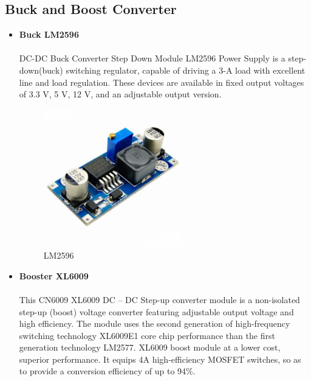 \newpage

\subsection{Buck and Boost Converter}

\begin{itemize}[wide, labelwidth=!, labelindent=0pt]
    \item \textbf{Buck LM2596}
    \vspace{-0.5cm}
    \paragraph{}DC-DC Buck Converter Step Down Module LM2596 Power Supply is a step-down(buck) switching regulator, capable of driving a 3-A load with excellent line and load regulation. These devices are available in fixed output voltages of 3.3 V, 5 V, 12 V, and an adjustable output version.
    
    \begin{figure}[H]
    \centering
    \includegraphics[width = 6cm]{project/images/lm2596.jpg}
    \caption{LM2596}
    \end{figure}
    
    
    \item \textbf{Booster XL6009}
    \vspace{-0.5cm}
    \paragraph{}This CN6009 XL6009 DC – DC Step-up converter module is a non-isolated step-up (boost) voltage converter featuring adjustable output voltage and high efficiency. The module uses the second generation of high-frequency switching technology XL6009E1 core chip performance than the first generation technology LM2577. XL6009 boost module at a lower cost, superior performance. It equips 4A high-efficiency MOSFET switches, so as to provide a conversion efficiency of up to 94\%.
    

\end{itemize}
